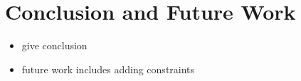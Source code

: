 \section{Conclusion and Future Work}\label{sec:conc}
\begin{itemize}
\item give conclusion
\item future work includes adding constraints
\end{itemize}